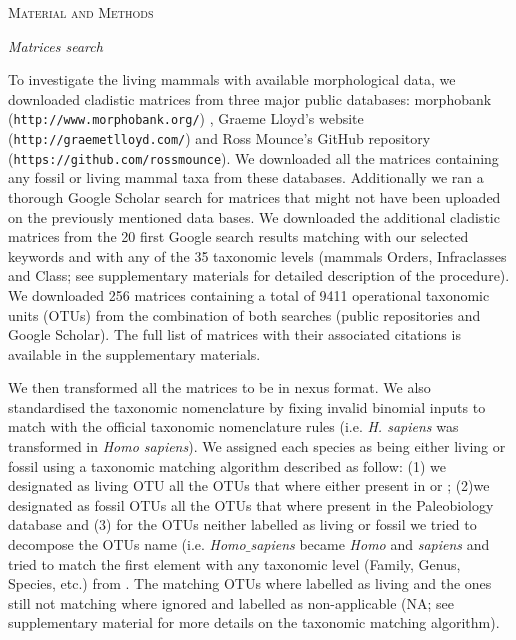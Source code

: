 \documentclass[12pt,letterpaper]{article}
\renewcommand{\section}[1]{%
\bigskip
\begin{center}
\begin{Large}
\normalfont\scshape #1
\medskip
\end{Large}
\end{center}}
\renewcommand{\subsection}[1]{%
\bigskip
\begin{center}
\begin{large}
\normalfont\itshape #1
\end{large}
\end{center}}
\begin{document}
%
%
 

\section{Material and Methods}
\subsection{Matrices search}
To investigate the living mammals with available morphological data, we downloaded cladistic matrices from three major public databases: morphobank (\texttt{http://www.morphobank.org/}) \citep{morphobank}, Graeme Lloyd's website (\texttt{http://graemetlloyd.com/}) and Ross Mounce's GitHub repository (\texttt{https://github.com/rossmounce}).
We downloaded all the matrices containing any fossil or living mammal taxa from these databases.
Additionally we ran a thorough Google Scholar search for matrices that might not have been uploaded on the previously mentioned data bases.
We downloaded the additional cladistic matrices from the 20 first Google search results matching with our selected keywords and with any of the 35 taxonomic levels (mammals Orders, Infraclasses and Class; see supplementary materials for detailed description of the procedure).
We downloaded 256 %
matrices containing a total of 9411 %
operational taxonomic units (OTUs) from the combination of both searches (public repositories and Google Scholar).
The full list of matrices with their associated citations is available in the supplementary materials. %

We then transformed all the matrices to be in nexus format.
We also standardised the taxonomic nomenclature by fixing invalid binomial inputs to match with the official taxonomic nomenclature rules (i.e. \textit{H. sapiens} was transformed in \textit{Homo sapiens}).
We assigned each species as being either living or fossil using a taxonomic matching algorithm described as follow: (1) we designated as living OTU all the OTUs that where either present in \citep{FritzTree} or \citep{wilson2005mammal}; (2)we designated as fossil OTUs all the OTUs that where present in the Paleobiology database and (3) for the OTUs neither labelled as living or fossil we tried to decompose the OTUs name (i.e. \textit{Homo$\_$sapiens} became \textit{Homo} and \textit{sapiens} and tried to match the first element with any taxonomic level (Family, Genus, Species, etc.) from \citep{wilson2005mammal}. %
The matching OTUs where labelled as living and the ones still not matching where ignored and labelled as non-applicable (NA; see supplementary material for more details on the taxonomic matching algorithm).
\end{document}
